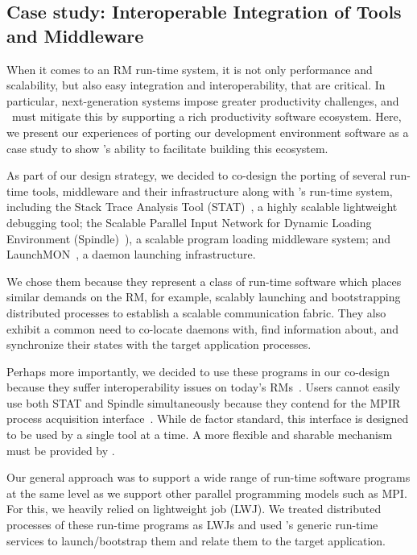 \subsection{Case study: Interoperable Integration of Tools and Middleware}
\label{case}
When it comes to an RM run-time system, it is 
not only performance and scalability,
but also easy integration and interoperability, that are critical.
In particular, next-generation systems impose greater productivity
challenges, and \flux\ must mitigate this by supporting a rich 
productivity software ecosystem. 
Here, we present our experiences of porting our development
environment software as a case study
to show \flux's ability to facilitate building this ecosystem. 

As part of our design strategy, we decided to 
co-design the porting of several run-time tools, middleware 
and their infrastructure along with \flux's run-time system,
including the Stack Trace Analysis Tool (STAT)~\cite{STAT},
a highly scalable lightweight debugging tool;
the Scalable Parallel Input Network for Dynamic Loading
Environment ({\sc Spindle})~\cite{SPINDLE}),
a scalable program loading middleware system;
and LaunchMON~\cite{launchmon}, a daemon launching infrastructure.

We chose them because they represent a class of run-time
software which places similar demands on the RM,
for example, scalably launching and bootstrapping
distributed processes to establish a scalable 
communication fabric.
They also exhibit a common need to co-locate daemons with, 
find information about, and synchronize their states with 
the target application processes.

Perhaps more importantly, we decided to use these programs
in our co-design because they suffer interoperability issues on 
today's RMs~\cite{Jette02slurm,ALPS,BGQRes,Castain05theopen}.
Users cannot easily use both STAT
and {\sc Spindle} simultaneously because they contend for
the MPIR process acquisition interface~\cite{MPIRInterface}.
While de factor standard, this interface is designed 
to be used by a single tool at a time. 
A more flexible and sharable mechanism must be provided by \flux.

Our general approach was to support a wide range of run-time software programs 
at the same level as we support other parallel programming 
models such as MPI. For this, we heavily relied on lightweight 
job (LWJ). We treated 
distributed processes of these run-time programs
as LWJs and used \flux's 
generic run-time services to launch/bootstrap them and 
relate them to the target application.%

